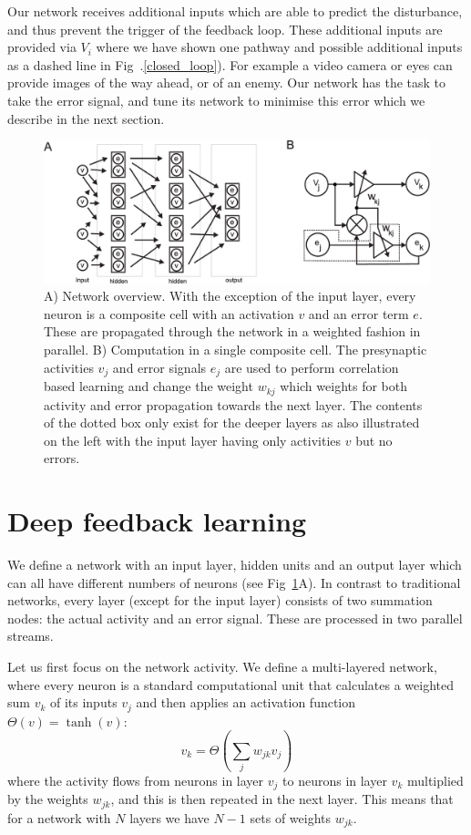 \documentclass{article}
\begin{document}
Our network receives additional inputs which are able to predict the
disturbance, and thus prevent the trigger of the feedback loop. These
additional inputs are provided via $V_i$ where we have shown one
pathway and possible additional inputs as a dashed line in
Fig~.\ref{closed_loop}).
For example a video camera or eyes can provide images of the way ahead,
or of an enemy. Our network has the task to take the error
signal, and tune its network to minimise this error which we describe
in the next section.

\begin{figure}[!ht]
  \centering
  \includegraphics[width=\columnwidth]{netw_together}
  \caption{A) Network overview. With the exception of the input layer, every
    neuron is a composite cell with an activation $v$ and an error
    term $e$. These are propagated through the network in a weighted
    fashion in parallel.  B) Computation in a single composite cell.
    The presynaptic activities $v_j$ and error signals $e_j$ are used
    to perform correlation based learning and change the weight
    $w_{kj}$ which weights for both activity and error propagation towards the next
    layer. The contents of the dotted box only exist for the deeper
    layers as also illustrated on the left with the input layer
    having only activities $v$ but no errors. \label{netw_together}}
\end{figure}


\section{Deep feedback learning}
We define a network with an input layer, hidden units and an output
layer which can all have different numbers of neurons (see
Fig~\ref{netw_together}A). In contrast to traditional
networks, every layer (except for the input layer) consists of two
summation nodes: the actual activity and an error signal. These
are processed in two parallel streams.

Let us first focus on the network activity. We define a multi-layered
network, where every neuron is a standard computational unit that
calculates a weighted sum $v_k$ of its inputs $v_j$ and then applies
an activation function $\Theta(v) = \tanh(v)$:
\begin{equation}
  v_k = \Theta\left( \sum_j w_{jk} v_{j} \right) \label{act_sum}
\end{equation}
where the activity flows from neurons in layer $v_j$ to neurons in
layer $v_k$ multiplied by the weights $w_{jk}$, and this
is then repeated in the next layer. This means that for a network with
$N$ layers we have $N-1$ sets of weights $w_{jk}$.
\end{document}
